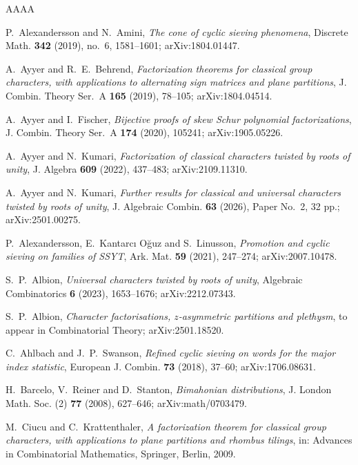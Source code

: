 \documentclass[11pt,reqno]{amsart}
\theoremstyle{plain}
\theoremstyle{definition}
\begin{document}
\begin{thebibliography}{AAAA}

 P.~Alexandersson and N.~Amini, \emph{The cone of cyclic sieving
phenomena}, Discrete Math. \textbf{342} (2019), no.~6, 1581--1601; arXiv:1804.01447.

 A.~Ayyer and R.~E.~Behrend, \emph{Factorization theorems for classical group
characters, with applications to alternating sign matrices and plane partitions}, J. Combin. Theory
Ser.~A \textbf{165} (2019), 78--105; arXiv:1804.04514.

 A.~Ayyer and I.~Fischer, \emph{Bijective proofs of skew Schur polynomial
factorizations}, J. Combin. Theory Ser.~A \textbf{174} (2020), 105241; arXiv:1905.05226.

 A.~Ayyer and N.~Kumari, \emph{Factorization of classical characters twisted by
roots of unity}, J. Algebra \textbf{609} (2022), 437--483; arXiv:2109.11310.

 A.~Ayyer and N.~Kumari, \emph{Further results for classical and universal
characters twisted by roots of unity}, J. Algebraic Combin. \textbf{63} (2026), Paper No.~2, 32 pp.;
arXiv:2501.00275.

 P.~Alexandersson, E.~Kantarc\i{} O\u{g}uz and S.~Linusson, \emph{Promotion and
cyclic sieving on families of SSYT}, Ark. Mat. \textbf{59} (2021), 247--274; arXiv:2007.10478.

 S.~P.~Albion, \emph{Universal characters twisted by roots of unity},
Algebraic Combinatorics \textbf{6} (2023), 1653--1676; arXiv:2212.07343.

 S.~P.~Albion, \emph{Character factorisations, $z$-asymmetric partitions and
plethysm}, to appear in Combinatorial Theory; arXiv:2501.18520.

 C.~Ahlbach and J.~P.~Swanson, \emph{Refined cyclic sieving on words for the
major index statistic}, European J. Combin. \textbf{73} (2018), 37--60; arXiv:1706.08631.

 H.~Barcelo, V.~Reiner and D.~Stanton, \emph{Bimahonian distributions},
J. London Math. Soc. (2) \textbf{77} (2008), 627--646; arXiv:math/0703479.

 M.~Ciucu and C.~Krattenthaler, \emph{A factorization theorem for classical
group characters, with applications to plane partitions and rhombus tilings}, in: Advances in
Combinatorial Mathematics, Springer, Berlin, 2009.


\end{thebibliography}
\end{document}
